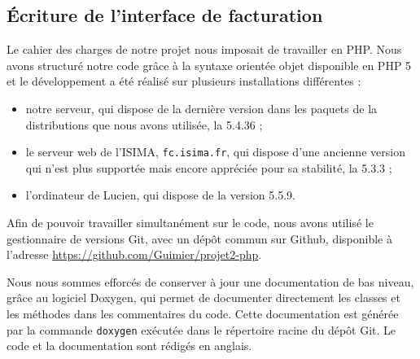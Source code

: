 \subsection{Écriture de l’interface de facturation}

Le cahier des charges de notre projet nous imposait de travailler en PHP. Nous avons structuré notre code grâce à la syntaxe orientée objet disponible en PHP 5 et le développement a été réalisé sur plusieurs installations différentes :
\begin{itemize}
	\item notre serveur, qui dispose de la dernière version dans les paquets de la distributions que nous avons utilisée, la 5.4.36 ;
	\item le serveur web de l’ISIMA, \texttt{fc.isima.fr}, qui dispose d’une ancienne version qui n’est plus supportée mais encore appréciée pour sa stabilité, la 5.3.3 ;
	\item l’ordinateur de Lucien, qui dispose de la version 5.5.9.
\end{itemize}

Afin de pouvoir travailler simultanément sur le code, nous avons utilisé le gestionnaire de versions Git, avec un dépôt commun sur Github, disponible à l’adresse \url{https://github.com/Guimier/projet2-php}.

Nous nous sommes efforcés de conserver à jour une documentation de bas niveau, grâce au logiciel Doxygen, qui permet de documenter directement les classes et les méthodes dans les commentaires du code. Cette documentation est générée par la commande \texttt{doxygen} exécutée dans le répertoire racine du dépôt Git. Le code et la documentation sont rédigés en anglais.
